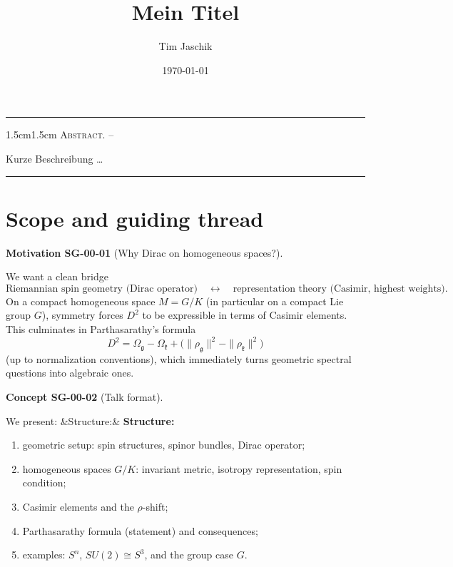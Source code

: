 \documentclass[10pt, letterpaper]{article}
\title{Mein Titel}
\author{Tim Jaschik}
\date{\today}
\newenvironment{romanenum}[1][]
  {%
    \ifx&#1&
    \else
      \textbf{#1}\quad
    \fi
    \begin{enumerate}[label=\roman*)]
  }
  {%
    \end{enumerate}%
  }
\renewenvironment{abstract}
  {
    \begin{adjustwidth}{1.5cm}{1.5cm}
    \small
    \textsc{Abstract. –}%
  }
  {
    \end{adjustwidth}
  }
\newcommand{\CustomHeading}[3]{%
  \par\medskip\noindent%
  \textbf{#1 #2} \textnormal{(#3)}.\enskip%
}
\newenvironment{CONC}[2]{\begin{unitbox}\CustomHeading{Concept}{#1}{#2}}{\end{unitbox}}
\newenvironment{MOT}[2]{\begin{unitbox}\CustomHeading{Motivation}{#1}{#2}}{\end{unitbox}}
\begin{document}
\maketitle
\rule{\textwidth}{0.5pt}
\begin{abstract}
Kurze Beschreibung …
\end{abstract}
\rule{\textwidth}{0.5pt}
\vspace{0.5cm}

\tableofcontents

\pagebreak




\section{Scope and guiding thread}

\begin{MOT}{SG-00-01}{Why Dirac on homogeneous spaces?}
We want a clean bridge
\[
\text{Riemannian spin geometry (Dirac operator)}\quad \longleftrightarrow\quad
\text{representation theory (Casimir, highest weights)}.
\]
On a compact homogeneous space $M=G/K$ (in particular on a compact Lie group $G$), symmetry forces $D^2$ to be expressible in terms of Casimir elements. This culminates in Parthasarathy's formula
\[
D^2 = \Omega_{\mathfrak g}-\Omega_{\mathfrak k}+\big(\|\rho_{\mathfrak g}\|^2-\|\rho_{\mathfrak k}\|^2\big)
\]
(up to normalization conventions), which immediately turns geometric spectral questions into algebraic ones.
\end{MOT}

\begin{CONC}{SG-00-02}{Talk format}
We present:
\begin{romanenum}[Structure:]
\item geometric setup: spin structures, spinor bundles, Dirac operator;
\item homogeneous spaces $G/K$: invariant metric, isotropy representation, spin condition;
\item Casimir elements and the $\rho$-shift;
\item Parthasarathy formula (statement) and consequences;
\item examples: $S^n$, $SU(2)\cong S^3$, and the group case $G$.
\end{romanenum}
\end{CONC}
\end{document}
